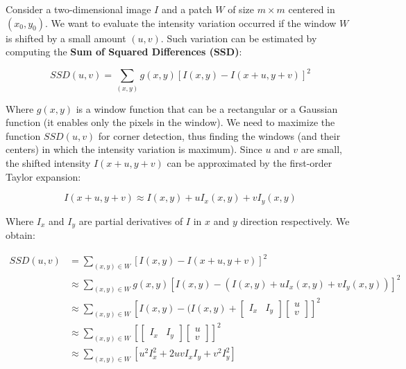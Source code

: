 \documentclass{article}
\begin{document}
Consider a two-dimensional image $I$ and a patch $W$ of size $m \times m$ centered in $(x_0, y_0)$. We want to evaluate the intensity variation occurred if the window $W$ is shifted by a small amount $(u, v)$. Such variation can be estimated by computing the \textbf{Sum of Squared Differences (SSD)}:

\begin{equation*}
    SSD(u, v) = \sum_{(x,y)}g(x,y)[I(x,y) - I(x+u, y+v)]^2
\end{equation*}

Where $g(x,y)$ is a window function that can be a rectangular or a Gaussian function (it enables only the pixels in the window). We need to maximize the function $SSD(u,v)$ for corner detection, thus finding the windows (and their centers) in which the intensity variation is maximum). Since $u$ and $v$ are small, the shifted intensity $I(x+u, y+v)$ can be approximated by the first-order Taylor expansion:

\begin{equation*}
    I(x+u, y+v) \approx I(x,y) + uI_x(x,y) + vI_y(x,y)
\end{equation*}

Where $I_x$ and $I_y$ are partial derivatives of $I$ in $x$ and $y$ direction respectively. We obtain:

\begin{equation*}
    \begin{split}
        SSD(u, v) & = \sum_{(x,y) \in W}[I(x,y) - I(x+u, y+v)]^2 \\ & \approx \sum_{(x,y) \in W}g(x,y)[I(x,y) - (I(x,y) + uI_x(x,y) + vI_y(x,y))]^2 \\
        & \approx \sum_{(x,y) \in W}[I(x,y) - (I(x,y) + \begin{bmatrix} I_x & I_y \end{bmatrix} \begin{bmatrix} u \\ v \end{bmatrix}]^2 \\
        & \approx \sum_{(x,y) \in W}[\begin{bmatrix} I_x & I_y \end{bmatrix} \begin{bmatrix} u \\ v \end{bmatrix}]^2 \\
        & \approx \sum_{(x,y) \in W}[u^2I_x^2+2uvI_xI_y+v^2I_y^2]
    \end{split}
\end{equation*}
\end{document}
